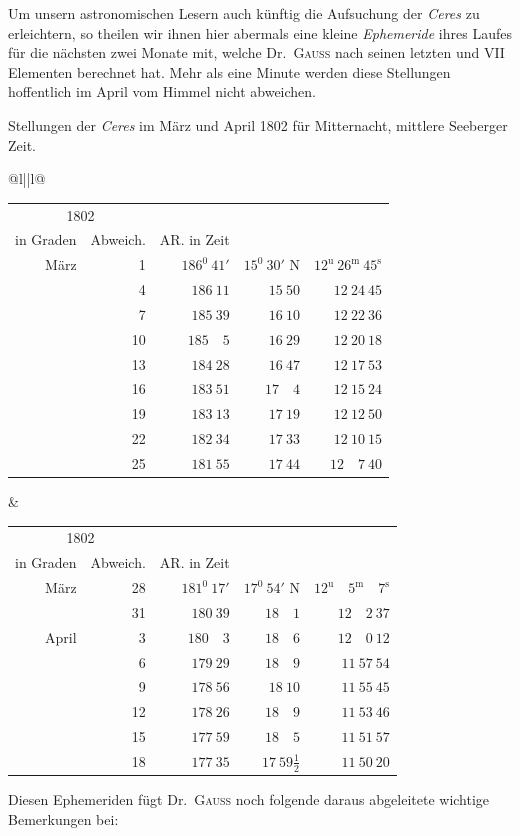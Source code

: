 Um unsern astronomischen Lesern auch künftig die Aufsuchung der \textit{Ceres} zu erleichtern, so theilen wir ihnen hier abermals eine kleine \textit{Ephemeride} ihres Laufes für die nächsten zwei Monate mit, welche Dr.\ \textsc{Gauss} nach seinen letzten und VII Elementen berechnet hat. Mehr als eine Minute werden diese Stellungen hoffentlich im April vom Himmel nicht abweichen.
\begin{center}
Stellungen der \textit{Ceres} im März und April 1802 für Mitternacht, mittlere Seeberger Zeit.\par\smallskip
\begingroup\fontsize{8.5}{10.5}\selectfont\setlength{\tabcolsep}{2.2pt}
\begin{tabular}{@{}l||l@{}}
\begin{tabular}[t]{@{}rr|r|r|r@{}}
\multicolumn{2}{c|}{1802}&\shortstack{AR. $\CeresSymbol$\\in Graden}&Abweich.&AR. in Zeit\\\hline
März&1&$186^0\ 41'$&$15^0\ 30'$ N&$12^{\mathrm u}\ 26^{\mathrm m}\ 45^{\mathrm s}$\\
&4&$186\ 11$&$15\ 50$&$12\ 24\ 45$\\
&7&$185\ 39$&$16\ 10$&$12\ 22\ 36$\\
&10&$185\quad5$&$16\ 29$&$12\ 20\ 18$\\
&13&$184\ 28$&$16\ 47$&$12\ 17\ 53$\\
&16&$183\ 51$&$17\quad4$&$12\ 15\ 24$\\
&19&$183\ 13$&$17\ 19$&$12\ 12\ 50$\\
&22&$182\ 34$&$17\ 33$&$12\ 10\ 15$\\
&25&$181\ 55$&$17\ 44$&$12\quad7\ 40$
\end{tabular}&
\begin{tabular}[t]{@{}rr|r|r|r@{}}
\multicolumn{2}{c|}{1802}&\shortstack{AR. $\CeresSymbol$\\in Graden}&Abweich.&AR. in Zeit\\\hline
März&28&$181^0\ 17'$&$17^0\ 54'$ N&$12^{\mathrm u}\quad5^{\mathrm m}\quad7^{\mathrm s}$\\
&31&$180\ 39$&$18\quad1$&$12\quad2\ 37$\\
April&3&$180\quad3$&$18\quad6$&$12\quad0\ 12$\\
&6&$179\ 29$&$18\quad9$&$11\ 57\ 54$\\
&9&$178\ 56$&$18\ 10$&$11\ 55\ 45$\\
&12&$178\ 26$&$18\quad9$&$11\ 53\ 46$\\
&15&$177\ 59$&$18\quad5$&$11\ 51\ 57$\\
&18&$177\ 35$&$17\ 59\frac12$&$11\ 50\ 20$
\end{tabular}
\end{tabular}\endgroup
\end{center}
Diesen Ephemeriden fügt Dr.\ \textsc{Gauss} noch folgende daraus abgeleitete wichtige Bemerkungen bei:

